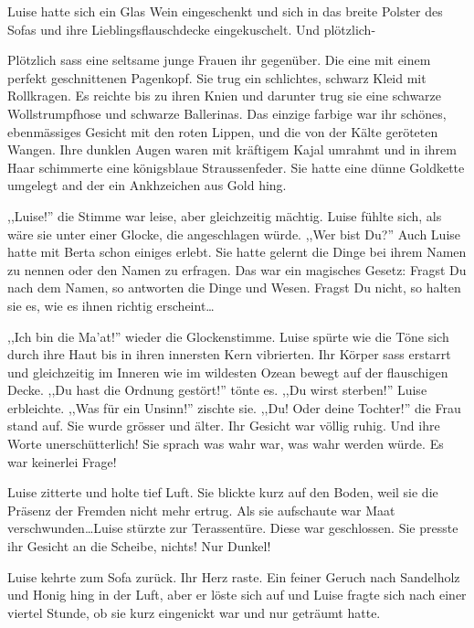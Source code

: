Luise hatte sich ein Glas Wein eingeschenkt und sich in das breite Polster des Sofas und ihre Lieblingsflauschdecke eingekuschelt. Und plötzlich-

Plötzlich sass eine seltsame junge Frauen ihr gegenüber. Die eine mit einem perfekt geschnittenen Pagenkopf. Sie trug ein schlichtes, schwarz Kleid mit Rollkragen. Es reichte bis zu ihren Knien und darunter trug sie eine schwarze Wollstrumpfhose und schwarze Ballerinas. Das einzige farbige war ihr schönes, ebenmässiges Gesicht mit den roten Lippen, und die von der Kälte geröteten Wangen. Ihre dunklen Augen waren mit kräftigem Kajal umrahmt und in ihrem Haar schimmerte eine königsblaue Straussenfeder. Sie hatte eine dünne Goldkette umgelegt and der ein Ankhzeichen aus Gold hing.

,,Luise!'' die Stimme war leise, aber gleichzeitig mächtig. Luise fühlte sich, als wäre sie unter einer Glocke, die angeschlagen würde. ,,Wer bist Du?'' Auch Luise hatte mit Berta schon einiges erlebt. Sie hatte gelernt die Dinge bei ihrem Namen zu nennen oder den Namen zu erfragen. Das war ein magisches Gesetz: Fragst Du nach dem Namen, so antworten die Dinge und Wesen. Fragst Du nicht, so halten sie es, wie es ihnen richtig erscheint\dots

,,Ich bin die Ma'at!'' wieder die Glockenstimme. Luise spürte wie die Töne sich durch ihre Haut bis in ihren innersten Kern vibrierten. Ihr Körper sass erstarrt und gleichzeitig im Inneren wie im wildesten Ozean bewegt auf der flauschigen Decke. ,,Du hast die Ordnung gestört!'' tönte es. ,,Du wirst sterben!'' Luise erbleichte. ,,Was für ein Unsinn!'' zischte sie. ,,Du! Oder deine Tochter!'' die Frau stand auf. Sie wurde grösser und älter. Ihr Gesicht war völlig ruhig. Und ihre Worte unerschütterlich! Sie sprach was wahr war, was wahr werden würde. Es war keinerlei Frage!

Luise zitterte und holte tief Luft. Sie blickte kurz auf den Boden, weil sie die Präsenz der Fremden nicht mehr ertrug. Als sie aufschaute war Maat verschwunden\dots Luise stürzte zur Terassentüre. Diese war geschlossen. Sie presste ihr Gesicht an die Scheibe, nichts! Nur Dunkel!

Luise kehrte zum Sofa zurück. Ihr Herz raste. Ein feiner Geruch nach Sandelholz und Honig hing in der Luft, aber er löste sich auf und Luise fragte sich nach einer viertel Stunde, ob sie kurz eingenickt war und nur geträumt hatte. 

